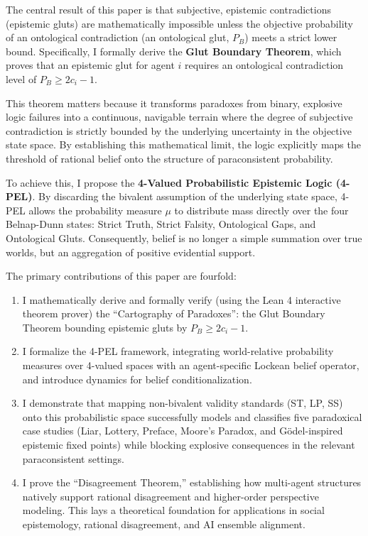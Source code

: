 \documentclass[11pt,a4paper]{article}
\begin{document}
The central result of this paper is that subjective, epistemic contradictions (epistemic gluts) are mathematically impossible unless the objective probability of an ontological contradiction (an ontological glut, $P_B$) meets a strict lower bound. Specifically, I formally derive the \textbf{Glut Boundary Theorem}, which proves that an epistemic glut for agent $i$ requires an ontological contradiction level of $P_B \ge 2c_i - 1$. 

This theorem matters because it transforms paradoxes from binary, explosive logic failures into a continuous, navigable terrain where the degree of subjective contradiction is strictly bounded by the underlying uncertainty in the objective state space. By establishing this mathematical limit, the logic explicitly maps the threshold of rational belief onto the structure of paraconsistent probability.

To achieve this, I propose the \textbf{4-Valued Probabilistic Epistemic Logic (4-PEL)}. By discarding the bivalent assumption of the underlying state space, 4-PEL allows the probability measure $\mu$ to distribute mass directly over the four Belnap-Dunn states: Strict Truth, Strict Falsity, Ontological Gaps, and Ontological Gluts. Consequently, belief is no longer a simple summation over true worlds, but an aggregation of positive evidential support.

The primary contributions of this paper are fourfold:
\begin{enumerate}
    \item I mathematically derive and formally verify (using the Lean 4 interactive theorem prover) the ``Cartography of Paradoxes'': the Glut Boundary Theorem bounding epistemic gluts by $P_B \ge 2c_i - 1$.
    \item I formalize the 4-PEL framework, integrating world-relative probability measures over 4-valued spaces with an agent-specific Lockean belief operator, and introduce dynamics for belief conditionalization.
    \item I demonstrate that mapping non-bivalent validity standards (ST, LP, SS) onto this probabilistic space successfully models and classifies five paradoxical case studies (Liar, Lottery, Preface, Moore's Paradox, and G\"odel-inspired epistemic fixed points) while blocking explosive consequences in the relevant paraconsistent settings.
    \item I prove the ``Disagreement Theorem,'' establishing how multi-agent structures natively support rational disagreement and higher-order perspective modeling. This lays a theoretical foundation for applications in social epistemology, rational disagreement, and AI ensemble alignment.
\end{enumerate}
\end{document}
